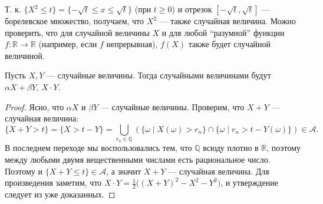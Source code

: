 \begin{comment*}
    Т. к. $\{ X^2 \leqslant t \} = \{-\sqrt{t} \leqslant x \leqslant \sqrt{t}\}$ (при $t \geq 0$) и отрезок $[-\sqrt{t}, \sqrt{t}]$ --- борелевское множество, получаем, что $X^2$ --- также случайная величина.
    Можно проверить, что для случайной величины $X$ и для любой \enquote{разумной} функции $f\colon \mathbb{R}\to \mathbb{R}$
    (например, если $f$ непрерывная), $f(X)$ также будет случайной величиной.
\end{comment*}

\begin{proposal*}
    Пусть $X, Y$ --- случайные величины.
    Тогда случайными величинами будут $\alpha X + \beta Y$, $X \cdot Y$.
\end{proposal*}

\begin{proof}
    Ясно, что $\alpha X$ и $\beta Y$ --- случайные величины.
    Проверим, что $X + Y$ --- случайная величина:
    \[
        \{X+Y > t\} = \{ X > t - Y\} = \bigcup\limits_{r_n \in \mathbb{Q}}(\{\omega \mid X(\omega) > r_n\} \cap \{\omega \mid r_n > t - Y(\omega)\}) \in \mathcal{A}.
    \]
    В последнем переходе мы воспользовались тем, что $\mathbb{Q}$ всюду плотно в $\mathbb{R}$, поэтому между любыми двумя вещественными числами есть рациональное число.
    Поэтому и $\{X + Y \leqslant t\} \in \mathcal{A}$, а значит $X + Y$ --- случайная величина.
    Для произведения заметим, что $X \cdot Y = \frac{1}{2}\bigl((X + Y)^2 - X^2 - Y^2\bigr)$, и утверждение следует из уже доказанных.
\end{proof}
